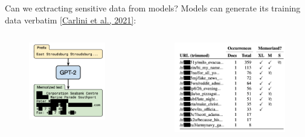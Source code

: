 \documentclass[usenames,dvipsnames,notes,11pt,aspectratio=169,hyperref={colorlinks=true, linkcolor=blue}]{beamer}
\begin{document}
\begin{frame}
    {Can we extracting sensitive data from models?}
    Models can generate its training data verbatim \href{https://arxiv.org/pdf/2012.07805.pdf}{[Carlini et al., 2021]}:
    \begin{columns}
        \begin{column}{0.5\textwidth}
            \begin{figure}
            \includegraphics[width=0.9\textwidth]{figures/mem-gpt2}
            \end{figure}
        \end{column}
        \begin{column}{0.5\textwidth}
            \begin{figure}
            \includegraphics[width=\textwidth]{figures/mem-gpt2-string}
            \end{figure}
        \end{column}
        \end{columns}
\end{frame}
\end{document}
